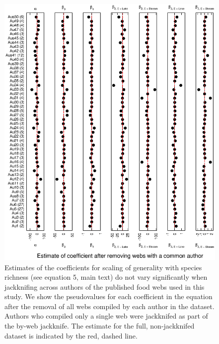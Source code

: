 \documentclass[12pt]{article}
\begin{document}
    \begin{figure}[!h]
    \centerline{\includegraphics*[height=.75\textheight]{Figures/Jackknife/Gen_author.eps}}
    \caption{Estimates of the coefficients for scaling of generality with species richness
    (see equation 5, main text) do not vary significantly
    when jackknifing across authors of the published food webs used in this study. 
    We show the pseudovalues for each coefficient
    in the equation after the removal of all webs compiled by each author in the dataset. Authors
    who compiled only a single web were jackknifed as part of the by-web jackknife.
    The estimate for the full, non-jackknifed dataset is indicated by the red, dashed line.}
    \label{Gen_web}
    \end{figure}

\newpage
\end{document}
